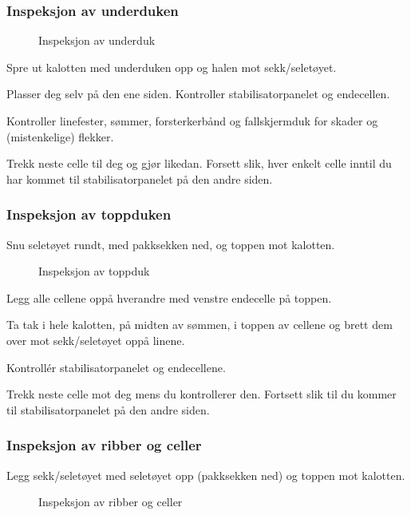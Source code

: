 \subsubsection{Inspeksjon av underduken}

\begin{figure}
	\caption{Inspeksjon av underduk}
\end{figure}

Spre ut kalotten med underduken opp og halen mot sekk/seletøyet.

Plasser deg selv på den ene siden. Kontroller stabilisatorpanelet og endecellen.

Kontroller linefester, sømmer, forsterkerbånd og fallskjermduk for skader og (mistenkelige) flekker.

Trekk neste celle til deg og gjør likedan.
Forsett slik, hver enkelt celle inntil du har kommet til stabilisatorpanelet på den andre siden.

\subsubsection{Inspeksjon av toppduken}
Snu seletøyet rundt, med pakksekken ned, og toppen mot kalotten.

\begin{figure}
	\caption{Inspeksjon av toppduk}
\end{figure}

Legg alle cellene oppå hverandre med venstre endecelle på toppen.

Ta tak i hele kalotten, på midten av sømmen, i toppen av cellene og brett dem over mot sekk/seletøyet oppå linene.

Kontrollér stabilisatorpanelet og endecellene.

Trekk neste celle mot deg mens du kontrollerer den. Fortsett slik til du kommer til stabilisatorpanelet på den andre siden.

\subsubsection{Inspeksjon av ribber og celler}
Legg sekk/seletøyet med seletøyet opp (pakksekken ned) og toppen mot kalotten.

\begin{figure}
	\caption{Inspeksjon av ribber og celler}
\end{figure}

